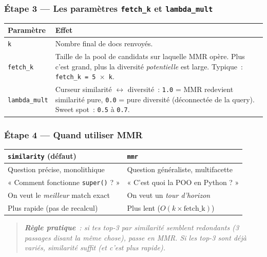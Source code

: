 \documentclass[11pt,a4paper]{article}
\begin{document}
\subsubsection*{Étape 3 — Les paramètres \texttt{fetch\_k} et
\texttt{lambda\_mult}}

\begin{center}
\begin{tabular}{p{4cm} p{10cm}}
\toprule
\textbf{Paramètre} & \textbf{Effet} \\
\midrule
\texttt{k} & Nombre final de docs renvoyés. \\[1mm]
\texttt{fetch\_k} & Taille de la pool de candidats sur laquelle MMR
opère. Plus c'est grand, plus la diversité \emph{potentielle} est large.
Typique~: \texttt{fetch\_k = 5 \(\times\) k}. \\[1mm]
\texttt{lambda\_mult} & Curseur similarité $\leftrightarrow$ diversité~:
\texttt{1.0} = MMR redevient similarité pure, \texttt{0.0} = pure
diversité (déconnectée de la query). Sweet spot~: \texttt{0.5} à
\texttt{0.7}. \\
\bottomrule
\end{tabular}
\end{center}

\subsubsection*{Étape 4 — Quand utiliser MMR}

\begin{center}
\begin{tabular}{p{6.5cm} p{6.5cm}}
\toprule
\textbf{\texttt{similarity} (défaut)} & \textbf{\texttt{mmr}} \\
\midrule
Question précise, monolithique
& Question généraliste, multifacette \\[1mm]
« Comment fonctionne \texttt{super()} ? »
& « C'est quoi la POO en Python ? » \\[1mm]
On veut le \emph{meilleur} match exact
& On veut un \emph{tour d'horizon} \\[1mm]
Plus rapide (pas de recalcul)
& Plus lent ($O(k \times \text{fetch\_k})$) \\
\bottomrule
\end{tabular}
\end{center}

\begin{quote}\itshape
\textbf{Règle pratique}~: si tes top-3 par similarité semblent
\emph{redondants} (3 passages disant la même chose), passe en MMR. Si
les top-3 sont déjà variés, similarité suffit (et c'est plus rapide).
\end{quote}
\end{document}
